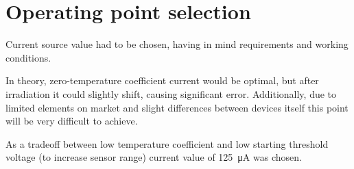 \section{Operating point selection}
    Current source value had to be chosen, having in mind requirements and working conditions.

    In theory, zero-temperature coefficient current would be optimal, but after irradiation it could slightly shift, causing significant error. Additionally, due to limited elements on market and slight differences between devices itself this point will be very difficult to achieve.

    As a tradeoff between low temperature coefficient and low starting threshold voltage (to increase sensor range) current value of \SI{125}{\micro\ampere} was chosen.
